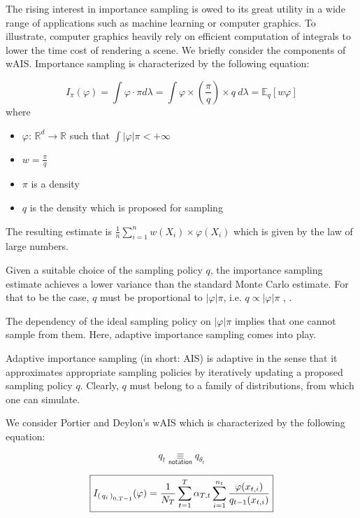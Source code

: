 \begin{multicols}{2}
The rising interest in importance sampling is owed to its great utility in a wide range of applications such as machine learning or computer graphics. To illustrate, computer graphics heavily rely on efficient computation of integrals to lower the time cost of rendering a scene. 
\newline
We briefly consider the components of wAIS.
Importance sampling is characterized by the following equation:




$$ I_\pi(\varphi) = \displaystyle \int \varphi \cdot \pi d\lambda = \int \varphi \times \left(\frac \pi q\right) \times q \ d\lambda = \mathbb{E}_q [ w \varphi]
$$
where 
\begin{itemize}
    \item $\varphi$: $\mathbb R^d \to \mathbb{R}$ such that $\int |\varphi| \pi < +\infty$
    \item $w = \frac \pi q$
    \item $\pi$ is a density 
    \item $q$ is the density which is proposed for sampling
\end{itemize}

The resulting estimate is $\frac 1 n \displaystyle\sum\limits_{i=1}^n w(X_i) \times \varphi(X_i)$
which is given by the law of large numbers.

\bigskip

Given a suitable choice of the sampling policy $q$, the importance sampling estimate achieves a lower variance than the standard Monte Carlo estimate. For that to be the case, $q$ must be proportional to $|\varphi|\pi$, i.e. $q \displaystyle \propto |\varphi| \pi$  \cite{hammersleyhandscombMCM}, \cite{evans2000approximating}. 

The dependency of the ideal sampling policy on $|\varphi|\pi$ implies that one cannot sample from them. Here, adaptive importance sampling comes into play. 

Adaptive importance sampling (in short: AIS) is adaptive in the sense that it approximates appropriate sampling policies by iteratively updating a proposed sampling policy $q$. Clearly, $q$ must belong to a family of distributions, from which one can simulate. 

\bigskip

We consider Portier and Deylon's wAIS which is characterized by the following equation:

$$q_t \underset {\textsf{notation}} \equiv q_{\theta_t}$$

$$\boxed{
I_{\left( \, {q} _ {i} \, \right)_{0, T-1}}(\varphi) = \frac 1 {N_T} \displaystyle\sum\limits_{t=1}^T \alpha_{T,t} \displaystyle\sum\limits_{i = 1}^{n_t} \frac {\varphi(x_{t,i})}{q_{t-1}(x_{t,i})}
}$$ ~\cite{portierdelyonWAIS}


\end{multicols}
